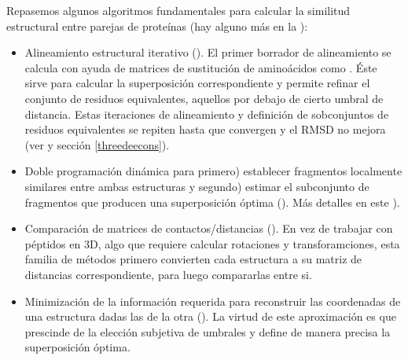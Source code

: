 Repasemos algunos algoritmos fundamentales para calcular la similitud estructural entre parejas de prote\'{i}nas
(hay alguno m\'{a}s en la ):
\begin{itemize}

\item Alineamiento estructural iterativo (). 
El primer borrador de alineamiento se calcula con ayuda de  matrices de sustituci\'{o}n de amino\'{a}cidos como 
. \'{E}ste sirve para calcular la superposici\'{o}n correspondiente y 
permite refinar el conjunto de residuos equivalentes, aquellos por debajo de cierto umbral de distancia.
Estas iteraciones de alineamiento y definici\'{o}n de sobconjuntos de residuos equivalentes se repiten hasta que convergen y 
el RMSD no mejora (ver \citet{Chothia1986} y secci\'{o}n \ref{threedeecons}).

\item Doble programaci\'{o}n din\'{a}mica para primero) establecer fragmentos localmente similares entre ambas estructuras y 
segundo) estimar el subconjunto de fragmentos que producen una superposici\'{o}n \'{o}ptima 
(). 
M\'{a}s detalles en este ).


\item Comparaci\'{o}n de matrices de contactos/distancias ().
En vez de trabajar con p\'{e}ptidos en 3D, algo que requiere calcular rotaciones y transforamciones, 
esta familia de m\'{e}todos primero convierten cada estructura a su matriz de distancias correspondiente,
para luego compararlas entre si.


\item Minimizaci\'{o}n de la informaci\'{o}n requerida para reconstruir las coordenadas de una estructura dadas las de la otra
(). La virtud de este aproximaci\'{o}n es que prescinde 
de la elecci\'{o}n subjetiva de umbrales y define de manera precisa la superposici\'{o}n \'{o}ptima.


\end{itemize}
